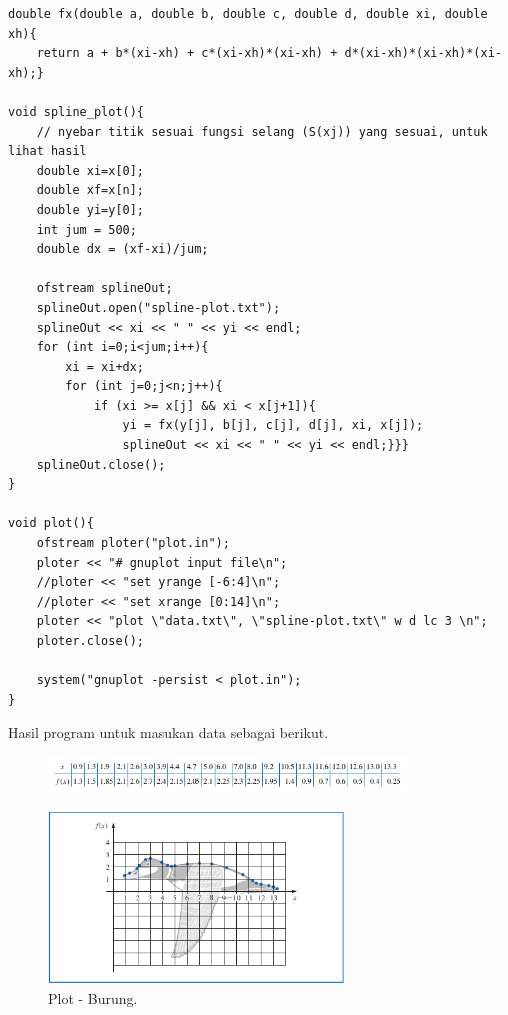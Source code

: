 \documentclass[paper=a4, fontsize=11pt]{scrartcl}
\numberwithin{equation}{section} %
\numberwithin{figure}{section} %
\numberwithin{table}{section} %
\begin{document}
\begin{small}
\begin{verbatim}
double fx(double a, double b, double c, double d, double xi, double xh){
    return a + b*(xi-xh) + c*(xi-xh)*(xi-xh) + d*(xi-xh)*(xi-xh)*(xi-xh);}

void spline_plot(){
    // nyebar titik sesuai fungsi selang (S(xj)) yang sesuai, untuk lihat hasil
    double xi=x[0];
    double xf=x[n];
    double yi=y[0];
    int jum = 500;
    double dx = (xf-xi)/jum;

    ofstream splineOut;
    splineOut.open("spline-plot.txt");
    splineOut << xi << " " << yi << endl;
    for (int i=0;i<jum;i++){
        xi = xi+dx;
        for (int j=0;j<n;j++){
            if (xi >= x[j] && xi < x[j+1]){
                yi = fx(y[j], b[j], c[j], d[j], xi, x[j]);
                splineOut << xi << " " << yi << endl;}}}
    splineOut.close();
}

void plot(){
    ofstream ploter("plot.in");
    ploter << "# gnuplot input file\n";
    //ploter << "set yrange [-6:4]\n";
    //ploter << "set xrange [0:14]\n";
    ploter << "plot \"data.txt\", \"spline-plot.txt\" w d lc 3 \n";
    ploter.close();
    
    system("gnuplot -persist < plot.in");
}
\end{verbatim}
\end{small} 

\newpage
Hasil program untuk masukan data sebagai berikut.
\begin{figure}
	\centering
	\includegraphics[width=0.85\textwidth]
		{data-burung.png}
\end{figure}
\begin{figure}
	\centering
	\includegraphics[width=0.7\textwidth]
		{burung.png}
	\caption{Plot - Burung.}
\end{figure}
\end{document}
